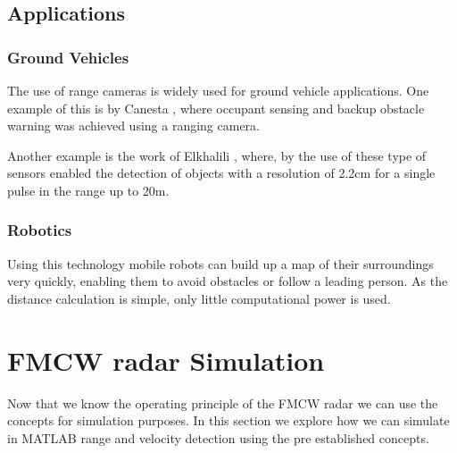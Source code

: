 \subsection{Applications}
\subsubsection{Ground Vehicles}
The use of range cameras is widely used for ground vehicle applications. One example of this is by Canesta \cite{hsu2006performance}, where  occupant sensing and backup obstacle warning was achieved using a ranging camera.

Another example is the work of Elkhalili \cite{}, where, by the use of these type of sensors enabled the detection of objects with a resolution of 2.2cm for a single pulse in the range up to 20m.

\subsubsection{Robotics}
Using this technology mobile robots can build up a map of their surroundings very quickly, enabling them to avoid obstacles or follow a leading person. As the distance calculation is simple, only little computational power is used.






\section{FMCW radar Simulation}
Now that we know the operating principle of the \ac{FMCW} \ac{radar} we can use the concepts for simulation purposes. In this section we explore how we can simulate in MATLAB range and velocity detection using the pre established concepts. 
